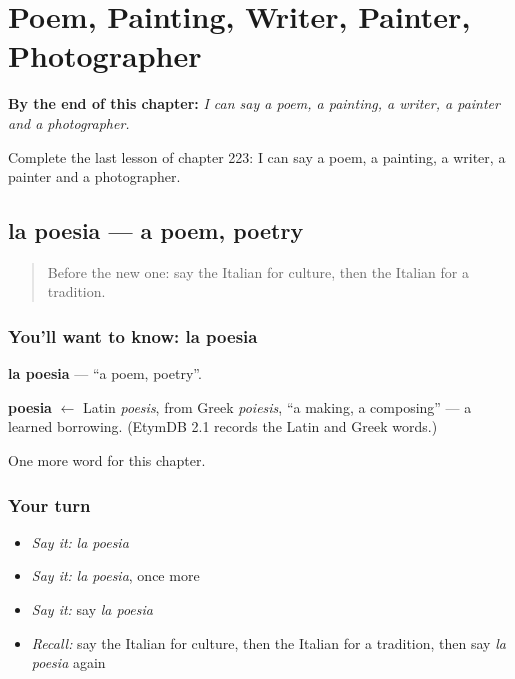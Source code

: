 
\chapter{Poem, Painting, Writer, Painter, Photographer}
\label{ch:it-poem-painting-writer-painter-photographer}

\begin{chapteropening}
\textbf{By the end of this chapter:} \emph{I can say a poem, a painting, a writer, a painter and a photographer.}

Complete the last lesson of chapter 223: I can say a poem, a painting, a writer, a painter and a photographer.
\end{chapteropening}

\section[la poesia]{la poesia — a poem, poetry}

\label{lesson:IT-C223-poesia}



\begin{quote}
Before the new one: say the Italian for culture, then the Italian for a tradition.
\end{quote}

\subsection*{You'll want to know: la poesia}
\textbf{la poesia} — \textquotedblleft{}a poem, poetry\textquotedblright{}.

\begin{cousinweb}
\textbf{poesia} $\leftarrow$ Latin \emph{poesis}, from Greek \emph{poiesis}, \textquotedblleft{}a making, a composing\textquotedblright{} — a learned borrowing. (EtymDB 2.1 records the Latin and Greek words.)
\end{cousinweb}

\begin{grammarlens}[title={What you've built}]
One more word for this chapter.
\end{grammarlens}

\subsection*{Your turn}
\begin{itemize}
\raggedright
  \item \emph{Say it:} \emph{la poesia}
  \item \emph{Say it:} \emph{la poesia}, once more
  \item \emph{Say it:} say \emph{la poesia}
  \item \emph{Recall:} say the Italian for culture, then the Italian for a tradition, then say \emph{la poesia} again
\end{itemize}

